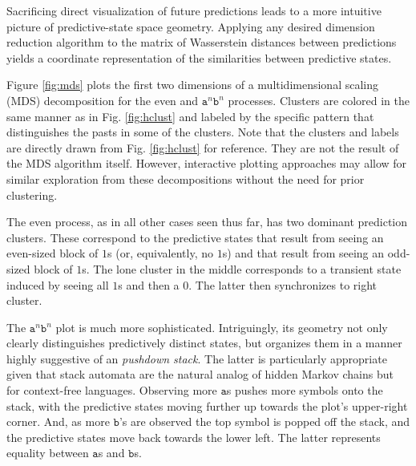 \documentclass[draft,aps,pre,twocolumn,groupaddress,showkeys,nofootinbib,preprintnumbers,floatfix]{revtex4-2}
\begin{document}
Sacrificing direct visualization of future predictions leads to a more
intuitive picture of predictive-state space geometry. Applying any desired
dimension reduction algorithm to the matrix of Wasserstein distances between
predictions yields a coordinate representation of the similarities between
predictive states.

Figure \ref{fig:mds} plots the first two dimensions of a multidimensional
scaling (MDS) decomposition \cite{Borg05a} for the even and
$\mathtt{a}^n\mathtt{b}^n$ processes. Clusters are colored in the same manner
as in Fig. \ref{fig:hclust} and labeled by the specific pattern that
distinguishes the pasts in some of the clusters. Note that the clusters and
labels are directly drawn from Fig. \ref{fig:hclust} for reference. They are
not the result of the MDS algorithm itself. However, interactive plotting
approaches may allow for similar exploration from these decompositions without
the need for prior clustering.

The even process, as in all other cases seen thus far, has two dominant
prediction clusters. These correspond to the predictive states that result
from seeing an even-sized block of $1$s (or, equivalently, no $1$s) and that
result from seeing an odd-sized block of $1$s. The lone cluster in the middle
corresponds to a transient state induced by seeing all $1$s and then a $0$.
The latter then synchronizes to right cluster.

The $\mathtt{a}^n\mathtt{b}^n$ plot is much more sophisticated. Intriguingly,
its geometry not only clearly distinguishes predictively distinct states, but
organizes them in a manner highly suggestive of an \emph{pushdown stack}. The
latter is particularly appropriate given that stack automata are the natural
analog of hidden Markov chains but for context-free languages. Observing more
$\mathtt{a}$s pushes more symbols onto the stack, with the predictive states
moving further up towards the plot's upper-right corner. And, as more
$\mathtt{b}$'s are observed the top symbol is popped off the stack, and the
predictive states move back towards the lower left. The latter represents
equality between $\mathtt{a}$s and $\mathtt{b}$s.
\end{document}
